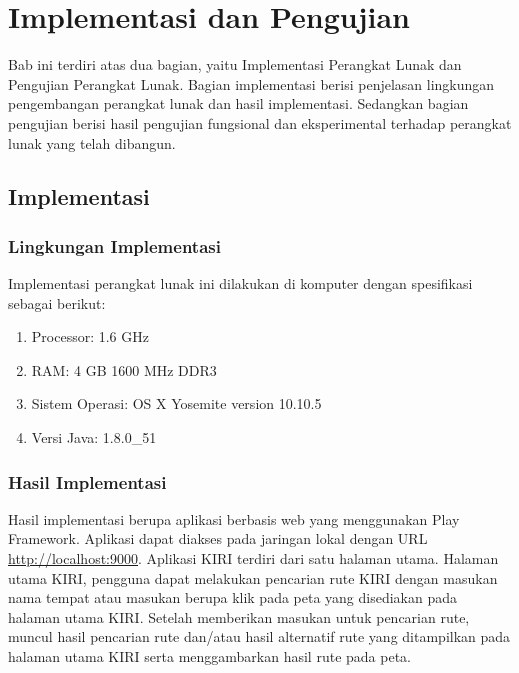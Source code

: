 \chapter{Implementasi dan Pengujian}
\label{chap:implementasiPengujian}

Bab ini terdiri atas dua bagian, yaitu Implementasi Perangkat Lunak dan Pengujian Perangkat Lunak. Bagian implementasi berisi penjelasan lingkungan pengembangan perangkat lunak dan hasil implementasi. Sedangkan bagian pengujian berisi hasil pengujian fungsional dan eksperimental terhadap perangkat lunak yang telah dibangun.

\section{Implementasi}
\label{sec:implementasi}

\subsection{Lingkungan Implementasi}
\label{sec:lingkungan_implementasi}
Implementasi perangkat lunak ini dilakukan di komputer dengan spesifikasi sebagai berikut:
\begin{enumerate}
	\item Processor: 1.6 GHz
	\item RAM: 4 GB 1600 MHz DDR3
	\item Sistem Operasi: OS X Yosemite version 10.10.5
	\item Versi Java: 1.8.0\_51
\end{enumerate}

\subsection{Hasil Implementasi}
Hasil implementasi berupa aplikasi berbasis web yang menggunakan Play Framework. Aplikasi dapat diakses pada jaringan lokal dengan URL \url{http://localhost:9000}. Aplikasi KIRI terdiri dari satu halaman utama. Halaman utama KIRI, pengguna dapat melakukan pencarian rute KIRI dengan masukan nama tempat atau masukan berupa klik pada peta yang disediakan pada halaman utama KIRI. Setelah memberikan masukan untuk pencarian rute, muncul hasil pencarian rute dan/atau hasil alternatif rute yang ditampilkan pada halaman utama KIRI serta menggambarkan hasil rute pada peta.

